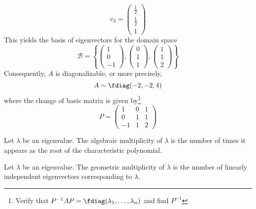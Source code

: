 \begin{exm}
\begin{flushleft}
\begin{equation*}
			v_3 = \begin{pmatrix}
				\frac{1}{2} \\[4pt]
				\frac{1}{2} \\[4pt]
				1
			\end{pmatrix}
		\end{equation*}
		This yields the basis of eigenvectors for the domain space
		\begin{equation*}
			\mathcal{B}=\left\{
			\begin{pmatrix}
				1 \\0\\-1
			\end{pmatrix},
			\begin{pmatrix}
				0 \\1\\1
			\end{pmatrix},
			\begin{pmatrix}
				1 \\1\\2
			\end{pmatrix}
			\right\}
		\end{equation*}
		Consequently, $A$ is diagonalizable, or more precisely,
		\begin{equation*}
			A\sim\fdiag(-2,-2,4)
		\end{equation*}
		where the change of basis matrix is given by\footnote{Verify that
			$P^{-1}AP=\fdiag(\lambda_1,\dots,\lambda_n)$ and find $P^{-1}$}
		\begin{equation*}
			P = \begin{pmatrix}
				1  & 0 & 1 \\
				0  & 1 & 1 \\
				-1 & 1 & 2
			\end{pmatrix}
		\end{equation*}
	\end{flushleft}
\end{exm}

\begin{definition}\label{def-algebraic-multiplicity}
	Let $\lambda$ be an eigenvalue. The algebraic multiplicity of $\lambda$ is the
	number of times it appears as the root of the characteristic polynomial.
\end{definition}

\begin{definition}\label{def-geometric-multiplicity}
	Let $\lambda$ be an eigenvalue. The geometric multiplicity of $\lambda$ is the number
	of linearly independent eigenvectors corresponding to $\lambda$.
\end{definition}

